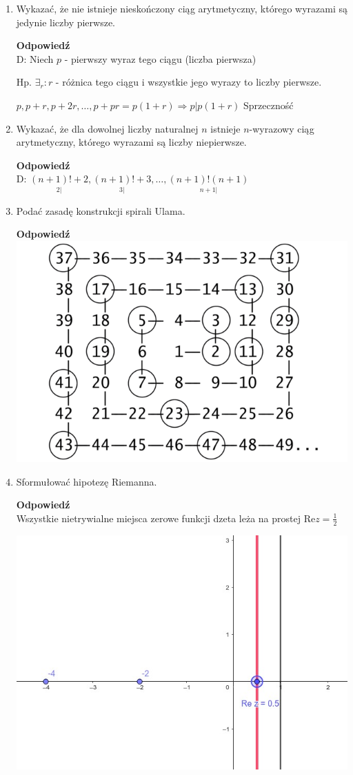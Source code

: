 \documentclass[12pt,a4paper]{article}
\theoremstyle{break}
\newcommand{\Odp}[1]{
		\begin{mdframed}[style=zadanie]
			\textbf{Odpowiedź}\\
			#1
		\end{mdframed}
	}
\begin{document}
\begin{enumerate}[1.]
	\item Wykazać, że nie istnieje nieskończony ciąg arytmetyczny, którego wyrazami są jedynie
	liczby pierwsze.
	\Odp{
		D: Niech $p$ - pierwszy wyraz tego ciągu (liczba pierwsza)
		
		Hp. $\exists_r : r$ - różnica tego ciągu i wszystkie jego wyrazy to liczby pierwsze.
		
		$p,p+r,p+2r,\dots,p+pr = p(1+r) \Rightarrow p|p(1+r)$ Sprzeczność 
	}
	
	\item Wykazać, że dla dowolnej liczby naturalnej $n$ istnieje $n$-wyrazowy ciąg arytmetyczny,
	którego wyrazami są liczby niepierwsze.
	\Odp{
		D: $\underset{2|}{(n+1)!+2},\underset{3|}{(n+1)!+3},\dots,\underset{n+1|}{(n+1)!(n+1)}$
	}
	
	\item Podać zasadę konstrukcji spirali Ulama.
	\Odp{
		
		\centering
		\includegraphics[width = 0.75\linewidth]{Ulam_Spiral.png}
	}
	
	\item Sformułować hipotezę Riemanna.
	\Odp{
		Wszystkie nietrywialne miejsca zerowe funkcji dzeta leża na prostej $\text{Re} z= \frac{1}{2}$
		
		\includegraphics[width=0.75\linewidth]{hpriemanna.jpeg}
		
}
\end{enumerate}
\end{document}
